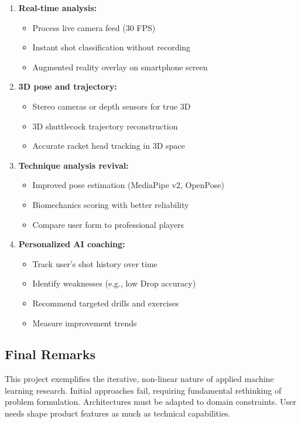 \documentclass[11pt,a4paper]{article}
\begin{document}
\begin{enumerate}
\item \textbf{Real-time analysis:}
   \begin{itemize}
   \item Process live camera feed (30 FPS)
   \item Instant shot classification without recording
   \item Augmented reality overlay on smartphone screen
   \end{itemize}

\item \textbf{3D pose and trajectory:}
   \begin{itemize}
   \item Stereo cameras or depth sensors for true 3D
   \item 3D shuttlecock trajectory reconstruction
   \item Accurate racket head tracking in 3D space
   \end{itemize}

\item \textbf{Technique analysis revival:}
   \begin{itemize}
   \item Improved pose estimation (MediaPipe v2, OpenPose)
   \item Biomechanics scoring with better reliability
   \item Compare user form to professional players
   \end{itemize}

\item \textbf{Personalized AI coaching:}
   \begin{itemize}
   \item Track user's shot history over time
   \item Identify weaknesses (e.g., low Drop accuracy)
   \item Recommend targeted drills and exercises
   \item Measure improvement trends
   \end{itemize}
\end{enumerate}

\subsection{Final Remarks}

This project exemplifies the iterative, non-linear nature of applied machine learning research. Initial approaches fail, requiring fundamental rethinking of problem formulation. Architectures must be adapted to domain constraints. User needs shape product features as much as technical capabilities.
\end{document}
